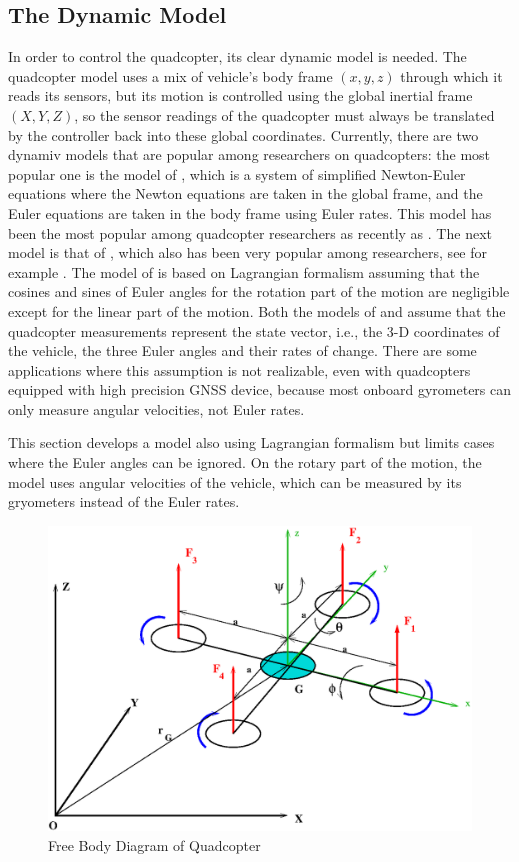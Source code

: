 \documentclass[twocolumn,10pt]{asme2e}
\begin{document}
\subsection*{The Dynamic Model}
In order to control the quadcopter, its clear dynamic model is needed. The quadcopter model uses a mix of vehicle's body frame $(x,y,z) $ through which it reads its sensors, but its motion is controlled using the global inertial frame $(X,Y,Z)$, so the sensor readings of the quadcopter must always be translated by the controller back into these global coordinates. Currently, there are two dynamiv models that are popular among researchers on quadcopters: the most popular one is the  model of \cite{1013341}, which is a system of simplified Newton-Euler equations where the Newton equations are taken in the global frame, and the Euler equations are taken in the body frame using Euler rates. This model has been the most popular among quadcopter researchers as recently as \cite{lee2009feedback,mu2019learning,castillo2019disturbance}. The next model is that of \cite{bouabdallah2007design}, which also has been very popular among researchers, see for example \cite{mellinger2012trajectory,alexis2011switching,leishman2014quadrotors}. The model of  \cite{bouabdallah2007design} is based on Lagrangian formalism assuming that the cosines and sines of Euler angles for the rotation part of the motion are negligible except for the linear part of the motion. Both the models of \cite{1013341} and \cite{bouabdallah2007design} assume that the quadcopter measurements represent the state vector, i.e., the 3-D coordinates of the vehicle, the three Euler angles and their rates of change. There are some applications where this assumption is not realizable, even with quadcopters equipped with high precision GNSS device, because most onboard gyrometers can only measure angular velocities, not Euler rates.


This section develops a model also using Lagrangian formalism but limits cases where the Euler angles can be ignored. On the rotary part of the motion, the model uses angular velocities of the vehicle, which can be measured by its gryometers instead of  the Euler rates.
\begin{figure}[h]
	\includegraphics[scale = 0.5]{model.eps}
	\caption{Free Body Diagram of Quadcopter}
\end{figure}
\end{document}
